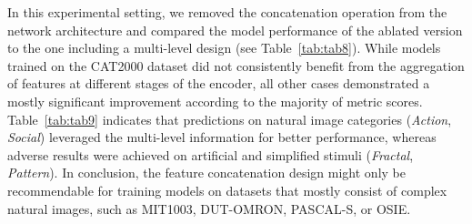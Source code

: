 \documentclass[final,1p,times,number]{elsarticle}
\begin{document}
In this experimental setting, we removed the concatenation operation from the network architecture and compared the model performance of the ablated version to the one including a multi-level design (see Table~\ref{tab:tab8}). While models trained on the CAT2000 dataset did not consistently benefit from the aggregation of features at different stages of the encoder, all other cases demonstrated a mostly significant improvement according to the majority of metric scores. Table~\ref{tab:tab9} indicates that predictions on natural image categories (\textit{Action}, \textit{Social}) leveraged the multi-level information for better performance, whereas adverse results were achieved on artificial and simplified stimuli (\textit{Fractal}, \textit{Pattern}). In conclusion, the feature concatenation design might only be recommendable for training models on datasets that mostly consist of complex natural images, such as MIT1003, DUT-OMRON, PASCAL-S, or OSIE.
\end{document}
